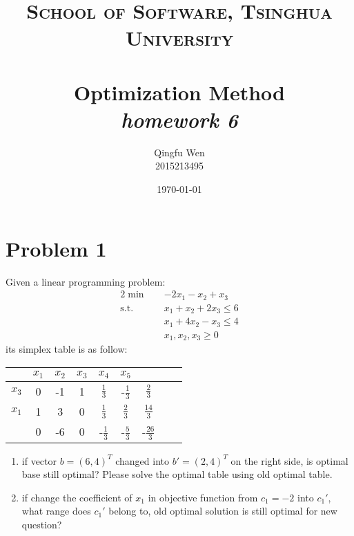 \documentclass[paper=a4, fontsize=11pt]{scrartcl} %
\title{	
\normalfont \normalsize
\textsc{School of Software, Tsinghua University} \\ [25pt] %
\horrule{0.5pt} \\[0.4cm] %
\huge Optimization Method\\ %
\LARGE\textit{homework 6}
\horrule{2pt} \\[0.5cm] %
}
\author{Qingfu Wen \\ \normalsize 2015213495} %
\date{\normalsize\today} %
\numberwithin{equation}{section} %
\numberwithin{figure}{section} %
\numberwithin{table}{section} %
\begin{document}
\maketitle %
\tableofcontents
\newpage
\section{Problem 1}
Given a linear programming problem:
\begin{alignat}{2}          \nonumber
\min\quad & -2x_1-x_2+x_3 \\    \nonumber
\mbox{s.t.}\quad            \nonumber
& x_1+x_2+2x_3 \leq 6\\        \nonumber
& x_1+4x_2-x_3 \leq 4\\         \nonumber
& x_1,x_2,x_3 \geq 0
\end{alignat}
its simplex table is as follow:
\begin{tabular}{|c|c|c|c|c|c|c|c|c|}
\hline &$x_1$&$x_2$&$x_3$&$x_4$&$x_5$&\\
\hline$x_3$&0&-1&1&$\frac{1}{3}$&-$\frac{1}{3}$&$\frac{2}{3}$\\
$x_1$&1&3&0&$\frac{1}{3}$&$\frac{2}{3}$&$\frac{14}{3}$\\
\hline &0&-6&0&-$\frac{1}{3}$&-$\frac{5}{3}$&-$\frac{26}{3}$\\
\hline
\end{tabular}
\begin{enumerate}
\item if vector $b=(6, 4)^T$ changed into $b' =(2,4)^T$ on the right side, is optimal base still optimal? Please solve the optimal table using old optimal table.
\item if change the coefficient of $x_1$ in objective function from $c_1=-2$ into $c_1'$, what range does $c_1'$ belong to, old optimal solution is still optimal for new question?
\end{enumerate}
\end{document}
